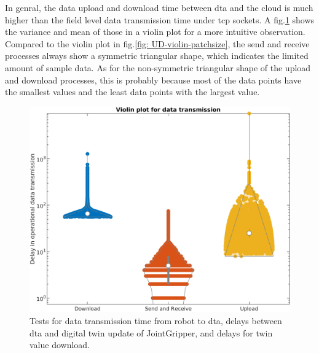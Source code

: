 In genral, the data upload and download time between \gls{dta} and the cloud 
is much higher than the field 
level data transmission time under \gls{tcp} sockets. A fig.\ref{fig: SR-U-D-violin} shows 
the variance and mean of those in a violin plot for a more intuitive observation. 
Compared to the violin plot in fig.\ref{fig: UD-violin-patchsize}, the send and receive 
processes always show a symmetric triangular shape, which indicates the 
limited amount of sample data. As for the non-symmetric triangular shape of 
the upload and download processes, this is probably because most of the data 
points have the smallest values and the least data points with the largest value.
\begin{figure}[htb]
    \includegraphics[width=\textwidth]{figures/tests/DT/log_violin_Plot_3cat.png}
    \centering
    \caption{Tests for data transmission time from robot to \gls{dta}, 
    delays between \gls{dta} and digital twin 
    update of JointGripper, and delays for twin value download.\label{fig: SR-U-D-violin}} 
\end{figure}